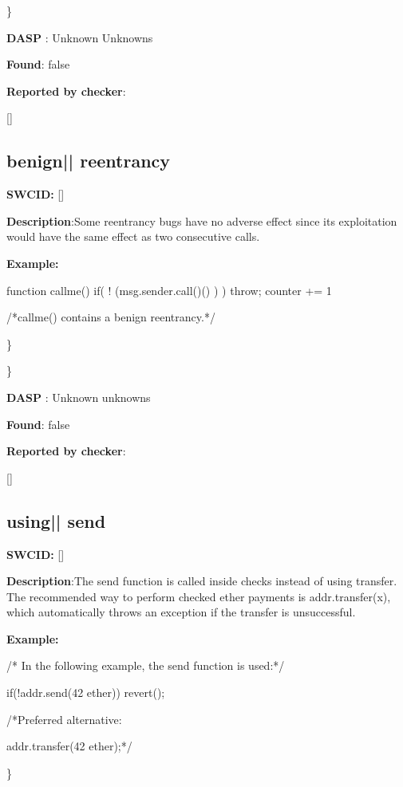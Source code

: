 \documentclass{article}
\begin{document}
\} 

\textbf{DASP} : Unknown Unknowns

\textbf{Found}: false

\textbf{Reported by checker}: 
\begin{ffcode} 

[]
\end{ffcode} 
\subsection{benign{|\textunderscore| }reentrancy} 
\textbf{SWC{\textunderscore }ID:} []

\textbf{Description}:Some re{\textendash}entrancy bugs have no adverse effect since its exploitation would have the same effect as two consecutive calls.


\textbf{Example:} 
\begin{ffcode} 

function callme(){
  if( ! (msg.sender.call()() ) ){
    throw;
  }
  counter += 1
}

 /*callme() contains a benign reentrancy.*/ 

\end{ffcode} 
\} 

\} 

\textbf{DASP} : Unknown unknowns

\textbf{Found}: false

\textbf{Reported by checker}: 
\begin{ffcode} 

[]
\end{ffcode} 
\subsection{using{|\textunderscore| }send} 
\textbf{SWC{\textunderscore }ID:} []

\textbf{Description}:The send function is called inside checks instead of using transfer. The recommended way to perform checked ether payments is addr.transfer(x), which automatically throws an exception if the transfer is unsuccessful.


\textbf{Example:} 
\begin{ffcode} 

/* In the following example, the send function is used:*/ 


if(!addr.send(42 ether)) {
    revert();
}

 /*Preferred alternative:

addr.transfer(42 ether);*/ 

\end{ffcode} 
\} 
\end{document}
